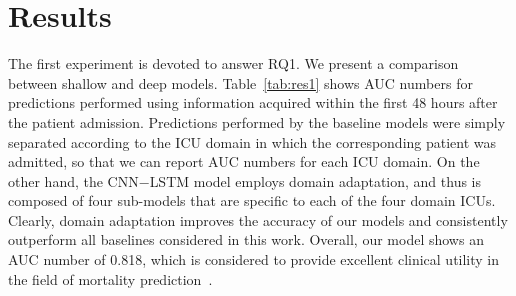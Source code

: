 \chapter{Results}
\label{chap:results}

The first experiment is devoted to answer RQ1. We present a comparison between shallow and deep models. Table~\ref{tab:res1} shows AUC numbers for predictions performed using information acquired within the first 48 hours after the patient admission. Predictions performed by the baseline models were simply separated according to the ICU domain in which the corresponding patient was admitted, so that we can report AUC numbers for each ICU domain. On the other hand, the CNN$-$LSTM model employs domain adaptation, and thus is composed of four sub-models that are specific to each of the four domain ICUs. Clearly, domain adaptation improves the accuracy of our models and consistently outperform all baselines considered in this work. Overall, our model shows an AUC number of 0.818, which is considered to provide excellent clinical utility in the field of mortality prediction~\citep{revisited}.


